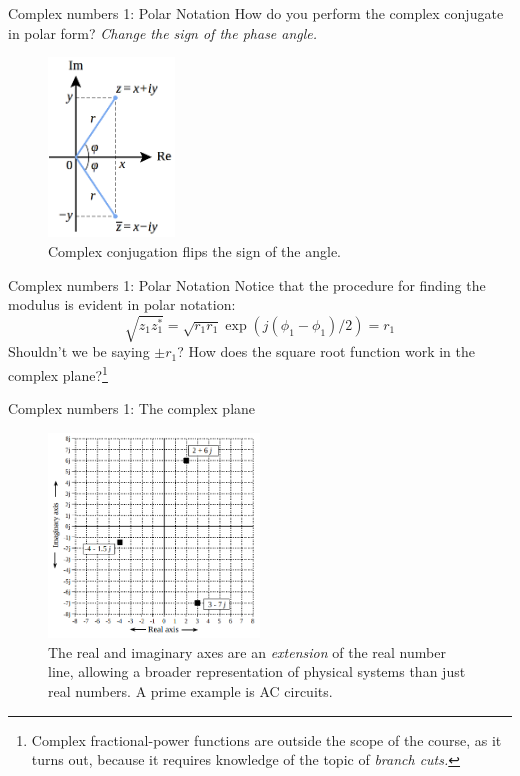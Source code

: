 \documentclass{beamer}
\begin{document}
\begin{frame}{Complex numbers 1: Polar Notation}
How do you perform the complex conjugate in polar form? \textit{Change the sign of the phase angle.}
\begin{figure}
\centering
\includegraphics[width=0.3\textwidth]{figures/cc.png}
\caption{\label{fig:complex3a} Complex conjugation flips the sign of the angle.}
\end{figure}
\end{frame}

\begin{frame}{Complex numbers 1: Polar Notation}
Notice that the procedure for finding the modulus is evident in polar notation:
\begin{equation}
\sqrt{z_1 z_1^*} = \sqrt{r_1 r_1} \exp(j(\phi_1 - \phi_1)/2) = r_1
\end{equation}
Shouldn't we be saying $\pm r_1$?  How does the square root function work in the complex plane?\footnote{Complex fractional-power functions are outside the scope of the course, as it turns out, because it requires knowledge of the topic of \textit{branch cuts.}}
\end{frame}

\begin{frame}{Complex numbers 1: The complex plane}
\begin{figure}
\centering
\includegraphics[width=0.5\textwidth]{figures/plane1.png}
\caption{\label{fig:complex4} The real and imaginary axes are an \textit{extension} of the real number line, allowing a broader representation of physical systems than just real numbers.  A prime example is AC circuits.}
\end{figure}
\end{frame}
\end{document}
